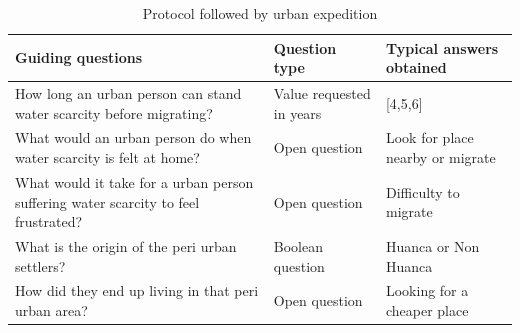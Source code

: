 \documentclass{article}
\begin{document}
\begin{table}[ht]
\centering
\caption{Protocol followed by urban expedition}
{\scriptsize
\begin{tabular}{m{2in}p{1in}p{1.7in}}
  \hline
Guiding questions & Question type & Typical answers obtained \\ 
  \hline
How long an urban person can stand water scarcity before migrating? & Value requested in years & [4,5,6] \\ 
  What would an urban person do when water scarcity is felt at home? & Open question & Look for place nearby or migrate \\ 
  What would it take for a urban person suffering water scarcity to feel frustrated? & Open question & Difficulty to migrate \\ 
  What is the origin of the peri urban settlers? & Boolean question & Huanca or Non Huanca \\ 
  How did they end up living in that peri urban area? & Open question & Looking for a cheaper place \\ 
   \hline
\end{tabular}
}
\label{urbanq}
\end{table}
\end{document}

